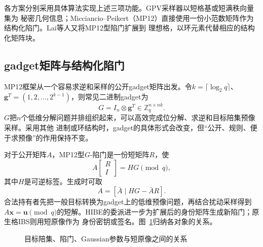 各方案分别采用具体算法实现上述三项功能。GPV采样器以短格基或短满秩向量集为
秘密几何信息；Micciancio--Peikert（MP12）直接使用一份小范数矩阵作为结构化陷门\cite{gpv2008,micciancio2012trapdoors}。Lai等人又将MP12型陷门扩展到
理想格，以环元素代替相应的结构化矩阵块\cite{lai2015trapdoors}。

\subsection{gadget矩阵与结构化陷门}

MP12框架从一个容易求逆和采样的公开gadget矩阵出发。令$k=\lceil\log_2q\rceil$、
$\mathbf g^T=(1,2,\ldots,2^{k-1})$，则常见二进制gadget为
\[
 G=I_n\otimes\mathbf g^T\in\mathbb Z_q^{n\times nk}.
\]
$G$把$n$个低维分解问题并排组织起来，可以高效完成位分解、求逆和目标陪集预像采样。采用其他
进制或环结构时，gadget的具体形式会改变，但“公开、规则、便于求预像”的作用保持不变。

对于公开矩阵$A$，MP12型$G$-陷门是一份短矩阵$R$，使
\[
 A\begin{bmatrix}R\\I\end{bmatrix}=HG\pmod q,
\]
其中$H$是可逆标签。生成时可取
\[
 A=[\bar A\mid HG-\bar A R].
\]
合法持有者先把一般目标转换为gadget上的低维预像问题，再结合扰动采样得到$A\mathbf x=\mathbf u
\pmod q$的短解。HIBE的委派进一步为扩展后的身份矩阵生成新陷门；原生格IBS则用短原像作为
身份密钥或签名。图~\ref{fig:preimage-sampling-foundation}归纳各对象的关系。

\begin{figure}[H]
\centering
{}
\caption{目标陪集、陷门、Gaussian参数与短原像之间的关系}
\label{fig:preimage-sampling-foundation}
\end{figure}


